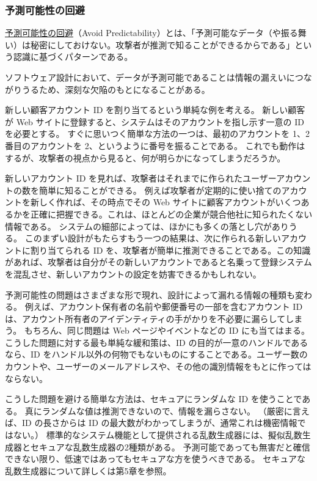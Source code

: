 \documentclass[uplatex]{jsarticle}
\def\label#1{}%
\begin{document}
\subsubsection{予測可能性の回避}

\begin{dfn}[予測可能性の回避]\label{dfn:ch4-avoid-predictability}
\underline{予測可能性の回避}（Avoid Predictability）とは、「予測可能なデータ（や振る舞い）は秘密にしておけない。攻撃者が推測で知ることができるからである」という認識に基づくパターンである。
\end{dfn}

ソフトウェア設計において、データが予測可能であることは情報の漏えいにつながりうるため、深刻な欠陥のもとになることがある。

\begin{exa}[連番の顧客アカウント ID]\label{exa:ch4-sequential-account-id}
新しい顧客アカウント ID を割り当てるという単純な例を考える。
新しい顧客が Web サイトに登録すると、システムはそのアカウントを指し示す一意の ID を必要とする。
すぐに思いつく簡単な方法の一つは、最初のアカウントを 1、2番目のアカウントを 2、というように番号を振ることである。
これでも動作はするが、攻撃者の視点から見ると、何が明らかになってしまうだろうか。

新しいアカウント ID を見れば、攻撃者はそれまでに作られたユーザーアカウントの数を簡単に知ることができる。
例えば攻撃者が定期的に使い捨てのアカウントを新しく作れば、その時点でその Web サイトに顧客アカウントがいくつあるかを正確に把握できる。これは、ほとんどの企業が競合他社に知られたくない情報である。
システムの細部によっては、ほかにも多くの落とし穴がありうる。
このまずい設計がもたらすもう一つの結果は、次に作られる新しいアカウントに割り当てられる ID を、攻撃者が簡単に推測できることである。この知識があれば、攻撃者は自分がその新しいアカウントであると名乗って登録システムを混乱させ、新しいアカウントの設定を妨害できるかもしれない。
\end{exa}

予測可能性の問題はさまざまな形で現れ、設計によって漏れる情報の種類も変わる。
例えば、アカウント保有者の名前や郵便番号の一部を含むアカウント ID は、アカウント所有者のアイデンティティの手がかりを不必要に漏らしてしまう。
もちろん、同じ問題は Web ページやイベントなどの ID にも当てはまる。
こうした問題に対する最も単純な緩和策は、ID の目的が一意のハンドルであるなら、ID をハンドル以外の何物でもないものにすることである。ユーザー数のカウントや、ユーザーのメールアドレスや、その他の識別情報をもとに作ってはならない。

こうした問題を避ける簡単な方法は、セキュアにランダムな ID を使うことである。
真にランダムな値は推測できないので、情報を漏らさない。
（厳密に言えば、ID の長さからは ID の最大数がわかってしまうが、通常これは機密情報ではない。）
標準的なシステム機能として提供される乱数生成器には、擬似乱数生成器とセキュアな乱数生成器の2種類がある。
予測可能であっても無害だと確信できない限り、低速ではあってもセキュアな方を使うべきである。
セキュアな乱数生成器について詳しくは第5章を参照。
\end{document}
